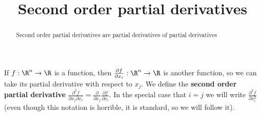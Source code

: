 \documentclass{ximera}
\title{Second order partial derivatives}
\begin{document}
	\begin{abstract}
		Second order partial derivatives are partial derivatives of partial derivatives
	\end{abstract}\maketitle
	
	\begin{definition}
		If $f:\R^n \to \R$ is a function, then $\frac{\partial f}{\partial x_i}:\R^n \to \R$ is another function, so we can take its partial derivative with respect to $x_j$.
		We define the \textbf{second order partial derivative} $\frac{\partial^2 f}{\partial x_j \partial x_i} = \frac{\partial}{\partial x_j} \frac{\partial f}{\partial x_i}$.  In the special case
		that $i=j$ we will write $\frac{\partial^2 f}{\partial x_i^2}$ (even though this notation is horrible, it is standard, so we will follow it).
	\end{definition}
	
\end{document}
